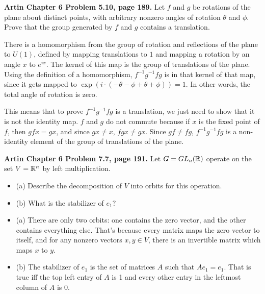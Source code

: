 \documentclass{article}
\begin{document}
\bigskip
\begin{prob}
    \textbf{Artin Chapter 6 Problem 5.10, page 189.} Let $f$ and $g$ be rotations of the plane about distinct points, with arbitrary nonzero angles of rotation $\theta$ and $\phi$. Prove that the group generated by $f$ and $g$ contains a translation.
\end{prob}
There is a homomorphism from the group of rotation and reflections of the plane to $U(1)$, defined by mapping translations to $1$ and mapping a rotation by an angle $x$ to $e^{ix}$. The kernel of this map is the group of translations of the plane. Using the definition of a homomorphism, $f^{-1}g^{-1}fg$ is in that kernel of that map, since it gets mapped to $\exp(i\cdot(-\theta - \phi + \theta + \phi)) = 1$. In other words, the total angle of rotation is zero.
\par
This means that to prove $f^{-1}g^{-1}fg$ is a translation, we just need to show that it is not the identity map. $f$ and $g$ do not commute because if $x$ is the fixed point of $f$, then $gfx=gx$, and since $gx\neq x$, $fgx\neq gx$. Since $gf \neq fg$, $f^{-1}g^{-1}fg$ is a non-identity element of the group of translations of the plane.

\bigskip
\begin{prob}
    \textbf{Artin Chapter 6 Problem 7.7, page 191.} Let $G = GL_n(\mathbb{R})$ operate on the set $V = \mathbb{R}^n$ by left multiplication.
    \begin{itemize}
        \item (a) Describe the decomposition of $V$ into orbits for this operation.
        \item (b) What is the stabilizer of $e_1$?
    \end{itemize}
\end{prob}
\begin{itemize}
    \item (a) There are only two orbits: one contains the zero vector, and the other contains everything else. That's because every matrix maps the zero vector to itself, and for any nonzero vectors $x, y \in V$, there is an invertible matrix which maps $x$ to $y$.
    \item (b) The stabilizer of $e_1$ is the set of matrices $A$ such that $Ae_1=e_1$. That is true iff the top left entry of $A$ is 1 and every other entry in the leftmost column of $A$ is 0.
\end{itemize}
\end{document}
